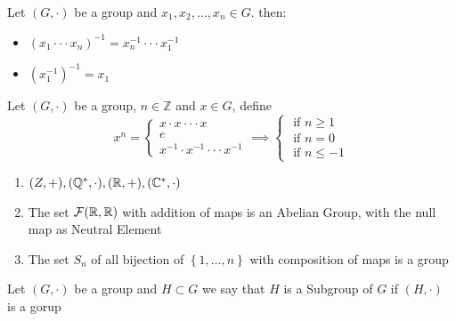 \exercise Let $(G, \cdot )  $ be a group and $x_1, x_2, \hdots , x_{n} \in G $. then: 
\begin{itemize}
\item  $(x_1 \cdot \cdot  \cdot x_{n}) ^{-1} = x_{n}^{-1} \cdot \cdot \cdot x_1^{-1}$
\item  $(x_1^{-1}) ^{-1} = x_1$
\end{itemize}

\begin{definition}[]
Let $(G, \cdot )  $  be a group, $n \in \mathbb{Z} $ and $x \in  G $, define 
\[
x^n = \begin{cases}
x \cdot x \cdot \cdot \cdot x 
\\
e\\
x^{-1} \cdot  x^{-1} \cdot \cdot \cdot x^{-1}
\end{cases}
\implies 
\begin{cases}
\text{ if } n \geq 1 \\
\text{ if } n = 0 \\
\text{ if } n \leq -1
\end{cases}
\]
\end{definition}
\begin{example}
\begin{enumerate}
\item $(Z, +), (\mathbb{Q}^{*}, \cdot ), (\mathbb{R} , +), (\mathbb{C}^{*}, \cdot)$ 
 \item The set $\mathcal{F} (\mathbb{R} , \mathbb{R} )  $  with addition of maps is an Abelian Group, with the null map
   as Neutral Element
  \item The set $S_{n} $ of all bijection of $\left\{ 1, \hdots , n \right\} $  with composition 
    of maps is a group 
\end{enumerate}
\end{example}
\begin{definition}
  Let $(G, \cdot )$ be a group and $H \subset G$ we say that $H $ is a Subgroup of $G $  if 
  $(H, \cdot )  $ is a gorup
\end{definition}


